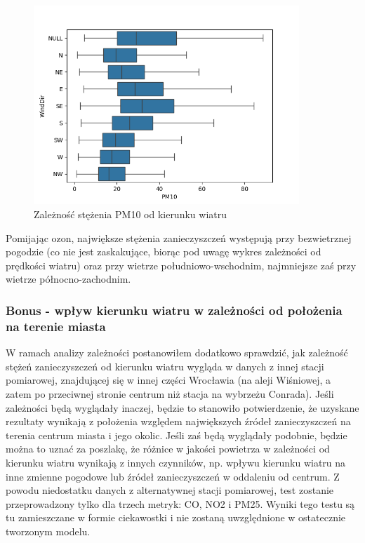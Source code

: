 \documentclass[18pt, letterpaper]{article}
\begin{document}
\begin{figure}[H]
\centering
\includegraphics[width=100mm, height=75mm]{visualisations/wind_dir_pollution_patterns/wind_dir_PM10.png}
\caption{Zależność stężenia PM10 od kierunku wiatru}
\end{figure}

Pomijając ozon, największe stężenia zanieczyszczeń występują przy bezwietrznej pogodzie (co nie jest zaskakujące, biorąc pod uwagę wykres zależności od prędkości wiatru) oraz przy wietrze południowo-wschodnim, najmniejsze zaś przy wietrze północno-zachodnim.

\subsubsection{Bonus - wpływ kierunku wiatru w zależności od położenia na terenie miasta}

W ramach analizy zależności postanowiłem dodatkowo sprawdzić, jak zależność stężeń zanieczyszczeń od kierunku wiatru wygląda w danych z innej stacji pomiarowej, znajdującej się w innej części Wrocławia (na aleji Wiśniowej, a zatem po przeciwnej stronie centrum niż stacja na wybrzeżu Conrada). Jeśli zależności będą wyglądały inaczej, będzie to stanowiło potwierdzenie, że uzyskane rezultaty wynikają z położenia względem największych źródeł zanieczyszczeń na terenia centrum miasta i jego okolic. Jeśli zaś będą wyglądały podobnie, będzie można to uznać za poszlakę, że różnice w jakości powietrza w zależności od kierunku wiatru wynikają z innych czynników, np. wpływu kierunku wiatru na inne zmienne pogodowe lub źródeł zanieczyszczeń w oddaleniu od centrum. Z powodu niedostatku danych z alternatywnej stacji pomiarowej, test zostanie przeprowadzony tylko dla trzech metryk: CO, NO2 i PM25. Wyniki tego testu są tu zamieszczane w formie ciekawostki i nie zostaną uwzględnione w ostatecznie tworzonym modelu.
\end{document}
